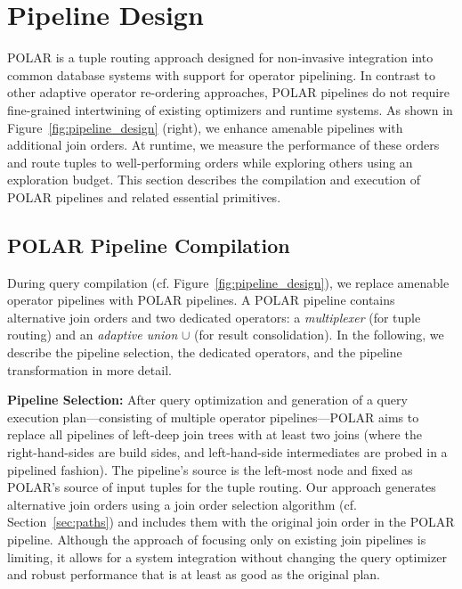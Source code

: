 
\section{Pipeline Design}
\label{pipeline-design}
%
POLAR is a tuple routing approach designed for non-invasive integration into common database systems with support for operator pipelining. In contrast to other adaptive operator re-ordering approaches, POLAR pipelines do not require fine-grained intertwining of existing optimizers and runtime systems. As shown in Figure~\ref{fig:pipeline_design} (right), we enhance amenable pipelines with additional join orders. At runtime, we measure the performance of these orders and route tuples to well-performing orders while exploring others using an exploration budget. This section describes the compilation and execution of POLAR pipelines and related essential primitives.

\subsection{POLAR Pipeline Compilation}
\label{pipeline-enhancement}

During query compilation (cf. Figure~\ref{fig:pipeline_design}), we replace amenable operator pipelines with POLAR pipelines. A POLAR pipeline contains alternative join orders and two dedicated operators: a \textit{multiplexer} (for tuple routing) and an \textit{adaptive union} $\cup$ (for result consolidation). In the following, we describe the pipeline selection, the dedicated operators, and the pipeline transformation in more detail.

\textbf{Pipeline Selection:} After query optimization and generation of a query execution plan---consisting of multiple operator pipelines---POLAR aims to replace all pipelines of left-deep join trees with at least two joins (where the right-hand-sides are build sides, and left-hand-side intermediates are probed in a pipelined fashion). The pipeline's source is the left-most node and fixed as POLAR's source of input tuples for the tuple routing. Our approach generates alternative join orders using a join order selection algorithm (cf. Section~\ref{sec:paths}) and includes them with the original join order in the POLAR pipeline. Although the approach of focusing only on existing join pipelines is limiting, it allows for a system integration without changing the query optimizer and robust performance that is at least as good as the original plan.

